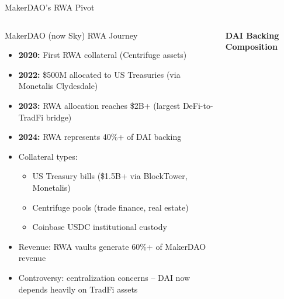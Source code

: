 \documentclass[8pt,aspectratio=169]{beamer}
\begin{document}
\begin{frame}{MakerDAO's RWA Pivot}
\begin{columns}[T]
\vspace{2mm}
\footnotesize
\begin{block}{MakerDAO (now Sky) RWA Journey}
\begin{itemize}
  \item \textbf{2020:} First RWA collateral (Centrifuge assets)
  \item \textbf{2022:} \$500M allocated to US Treasuries (via Monetalis Clydesdale)
  \item \textbf{2023:} RWA allocation reaches \$2B+ (largest DeFi-to-TradFi bridge)
  \item \textbf{2024:} RWA represents 40\%+ of DAI backing
  \item Collateral types:
    \begin{itemize}\tiny
      \item US Treasury bills (\$1.5B+ via BlockTower, Monetalis)
      \item Centrifuge pools (trade finance, real estate)
      \item Coinbase USDC institutional custody
    \end{itemize}
  \item Revenue: RWA vaults generate 60\%+ of MakerDAO revenue
  \item Controversy: centralization concerns -- DAI now depends heavily on TradFi assets
\end{itemize}
\end{block}

\vspace{2mm}
\centering
{\scriptsize\textbf{DAI Backing Composition}}
\vspace{2mm}


\end{columns}
\end{frame}
\end{document}
